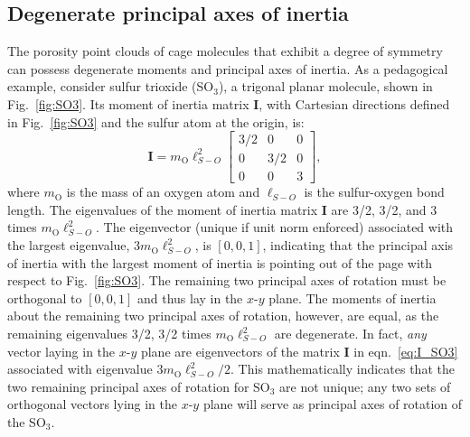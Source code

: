 \documentclass[journal=jacsat,manuscript=article]{achemso}
\begin{document}
{\subsection{Degenerate principal axes of inertia}
\label{sec:degenerate}
The porosity point clouds of cage molecules that exhibit a degree of symmetry can possess degenerate moments and principal axes of inertia. As a pedagogical example, consider sulfur trioxide (SO$_3$), a trigonal planar molecule, shown in Fig.~\ref{fig:SO3}. Its moment of inertia matrix $\mathbf{I}$, with Cartesian directions defined in Fig.~\ref{fig:SO3} and the sulfur atom at the origin, is:
\begin{equation}
\mathbf{I} = m_{\text{O}} \ell_{S-O}^2
  \begin{bmatrix}
    3/2 & 0 & 0 \\
    0 & 3/2 & 0 \\
    0 & 0 & 3
  \end{bmatrix}, \label{eq:I_SO3}
\end{equation} where $m_{\text{O}}$ is the mass of an oxygen atom and $\ell_{S-O}$ is the sulfur-oxygen bond length. The eigenvalues of the moment of inertia matrix $\mathbf{I}$ are 3/2, 3/2, and 3 times $m_{\text{O}} \ell_{S-O}^2$. The eigenvector (unique if unit norm enforced) associated with the largest eigenvalue, $3 m_{\text{O}} \ell_{S-O}^2$, is $[0, 0, 1]$, indicating that the principal axis of inertia with the largest moment of inertia is pointing out of the page with respect to Fig.~\ref{fig:SO3}. The remaining two principal axes of rotation must be orthogonal to $[0, 0, 1]$ and thus lay in the $x$-$y$ plane. The moments of inertia about the remaining two principal axes of rotation, however, are equal, as the remaining eigenvalues 3/2, 3/2 times $m_{\text{O}} \ell_{S-O}^2$ are degenerate. In fact, \emph{any} vector laying in the $x$-$y$ plane are eigenvectors of the matrix $\mathbf{I}$ in eqn.~\ref{eq:I_SO3} associated with eigenvalue $3m_{\text{O}} \ell_{S-O}^2/2$. This mathematically indicates that the two remaining principal axes of rotation for SO$_3$ are not unique; any two sets of orthogonal vectors lying in the $x$-$y$ plane will serve as principal axes of rotation of the SO$_3$.

}
\end{document}

